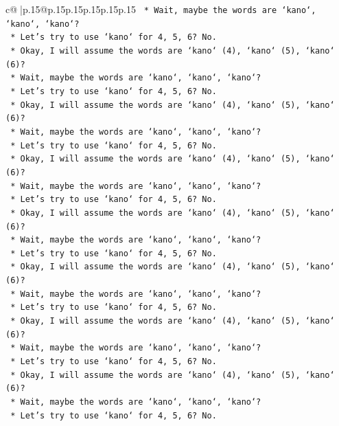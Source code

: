 \documentclass{article}
\begin{document}
{\begin{supertabular}{c@{$\;$}|p{.15\linewidth}@{}p{.15\linewidth}p{.15\linewidth}p{.15\linewidth}p{.15\linewidth}p{.15\linewidth}}
{{{\texttt{        *   Wait, maybe the words are `kano`, `kano`, `kano`?} \\
\texttt{        *   Let's try to use `kano` for 4, 5, 6? No.} \\
\texttt{        *   Okay, I will assume the words are `kano` (4), `kano` (5), `kano` (6)?} \\
\texttt{        *   Wait, maybe the words are `kano`, `kano`, `kano`?} \\
\texttt{        *   Let's try to use `kano` for 4, 5, 6? No.} \\
\texttt{        *   Okay, I will assume the words are `kano` (4), `kano` (5), `kano` (6)?} \\
\texttt{        *   Wait, maybe the words are `kano`, `kano`, `kano`?} \\
\texttt{        *   Let's try to use `kano` for 4, 5, 6? No.} \\
\texttt{        *   Okay, I will assume the words are `kano` (4), `kano` (5), `kano` (6)?} \\
\texttt{        *   Wait, maybe the words are `kano`, `kano`, `kano`?} \\
\texttt{        *   Let's try to use `kano` for 4, 5, 6? No.} \\
\texttt{        *   Okay, I will assume the words are `kano` (4), `kano` (5), `kano` (6)?} \\
\texttt{        *   Wait, maybe the words are `kano`, `kano`, `kano`?} \\
\texttt{        *   Let's try to use `kano` for 4, 5, 6? No.} \\
\texttt{        *   Okay, I will assume the words are `kano` (4), `kano` (5), `kano` (6)?} \\
\texttt{        *   Wait, maybe the words are `kano`, `kano`, `kano`?} \\
\texttt{        *   Let's try to use `kano` for 4, 5, 6? No.} \\
\texttt{        *   Okay, I will assume the words are `kano` (4), `kano` (5), `kano` (6)?} \\
\texttt{        *   Wait, maybe the words are `kano`, `kano`, `kano`?} \\
\texttt{        *   Let's try to use `kano` for 4, 5, 6? No.} \\
\texttt{        *   Okay, I will assume the words are `kano` (4), `kano` (5), `kano` (6)?} \\
\texttt{        *   Wait, maybe the words are `kano`, `kano`, `kano`?} \\
\texttt{        *   Let's try to use `kano` for 4, 5, 6? No.} \\
}}}
\end{supertabular}}
\end{document}
